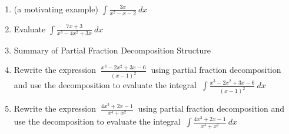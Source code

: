 \documentclass[11pt,fleqn]{article}
\begin{document}
\renewcommand{\headrulewidth}{0pt}
\newcommand{\blank}[1]{\rule{#1}{0.75pt}}
\newcommand{\bc}{\begin{center}}
\newcommand{\ec}{\end{center}}
\renewcommand{\d}{\displaystyle}

\vspace*{-0.7in}

\begin{center}
  \large
  \\
   
\end{center}

\begin{enumerate}
\item (a motivating example) $\displaystyle{\int \frac{3x}{x^2-x-2} \: dx }$
\vfill
\item Evaluate $\displaystyle{\int \frac{7x+3}{x^3-4x^2+3x} \: dx}$
\vfill
\item Summary of Partial Fraction Decomposition Structure
\vspace{2in}
\newpage
\item Rewrite the expression {\large{$\: \frac{x^3-2x^2+3x-6}{(x-1)^2} \:$ }} using partial fraction decomposition and use the decomposition to evaluate the integral {\large{$\:\int  \frac{x^3-2x^2+3x-6}{(x-1)^2} \:dx$ }}

\vfill
\item Rewrite the expression {\large{$\: \frac{4x^3+2x-1}{x^4+x^2} \:$ }} using partial fraction decomposition and use the decomposition to evaluate the integral {\large{$\:\int  \frac{4x^3+2x-1}{x^4+x^2}  \:dx$ }}

\vfill


%

\end{enumerate}
\end{document}
